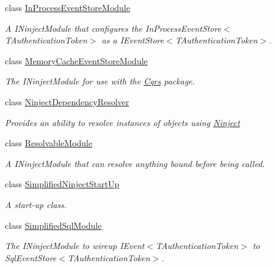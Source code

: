 \begin{DoxyCompactItemize}
class \hyperlink{classCqrs_1_1Ninject_1_1Configuration_1_1InProcessEventStoreModule}{In\+Process\+Event\+Store\+Module}
\begin{DoxyCompactList}\small\item\em A I\+Ninject\+Module that configures the In\+Process\+Event\+Store$<$\+T\+Authentication\+Token$>$ as a I\+Event\+Store$<$\+T\+Authentication\+Token$>$. \end{DoxyCompactList}\item 
class \hyperlink{classCqrs_1_1Ninject_1_1Configuration_1_1MemoryCacheEventStoreModule}{Memory\+Cache\+Event\+Store\+Module}
\begin{DoxyCompactList}\small\item\em The I\+Ninject\+Module for use with the \hyperlink{namespaceCqrs}{Cqrs} package. \end{DoxyCompactList}\item 
class \hyperlink{classCqrs_1_1Ninject_1_1Configuration_1_1NinjectDependencyResolver}{Ninject\+Dependency\+Resolver}
\begin{DoxyCompactList}\small\item\em Provides an ability to resolve instances of objects using \hyperlink{namespaceCqrs_1_1Ninject}{Ninject} \end{DoxyCompactList}\item 
class \hyperlink{classCqrs_1_1Ninject_1_1Configuration_1_1ResolvableModule}{Resolvable\+Module}
\begin{DoxyCompactList}\small\item\em A I\+Ninject\+Module that can resolve anything bound before being called. \end{DoxyCompactList}\item 
class \hyperlink{classCqrs_1_1Ninject_1_1Configuration_1_1SimplifiedNinjectStartUp}{Simplified\+Ninject\+Start\+Up}
\begin{DoxyCompactList}\small\item\em A start-\/up class. \end{DoxyCompactList}\item 
class \hyperlink{classCqrs_1_1Ninject_1_1Configuration_1_1SimplifiedSqlModule}{Simplified\+Sql\+Module}
\begin{DoxyCompactList}\small\item\em The I\+Ninject\+Module to wireup I\+Event$<$\+T\+Authentication\+Token$>$ to Sql\+Event\+Store$<$\+T\+Authentication\+Token$>$. \end{DoxyCompactList}\end{DoxyCompactItemize}
